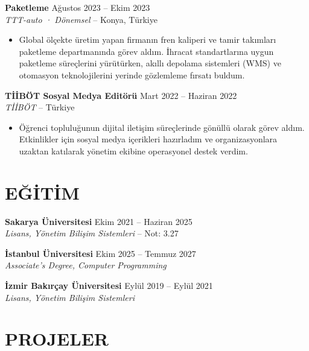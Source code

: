 \documentclass[a4paper,8pt]{article}
\begin{document}
\textbf{Paketleme} \hfill {\small Ağustos 2023 -- Ekim 2023}\\
{\small \textit{TTT-auto · Dönemsel} -- Konya, Türkiye}
\begin{itemize}
\item {\small Global ölçekte üretim yapan firmanın fren kaliperi ve tamir takımları paketleme departmanında görev aldım. İhracat standartlarına uygun paketleme süreçlerini yürütürken, akıllı depolama sistemleri (WMS) ve otomasyon teknolojilerini yerinde gözlemleme fırsatı buldum.}
\end{itemize}

\vspace{0pt}

\textbf{TİİBÖT Sosyal Medya Editörü} \hfill {\small Mart 2022 -- Haziran 2022}\\
{\small \textit{TİİBÖT} -- Türkiye}
\begin{itemize}
\item {\small Öğrenci topluluğunun dijital iletişim süreçlerinde gönüllü olarak görev aldım. Etkinlikler için sosyal medya içerikleri hazırladım ve organizasyonlara uzaktan katılarak yönetim ekibine operasyonel destek verdim.}
\end{itemize}

\section{EĞİTİM}

\textbf{Sakarya Üniversitesi} \hfill {\small Ekim 2021 -- Haziran 2025}\\
{\small \textit{Lisans, Yönetim Bilişim Sistemleri} -- Not: 3.27}

\vspace{0pt}

\textbf{İstanbul Üniversitesi} \hfill {\small Ekim 2025 -- Temmuz 2027}\\
{\small \textit{Associate's Degree, Computer Programming}}

\vspace{0pt}

\textbf{İzmir Bakırçay Üniversitesi} \hfill {\small Eylül 2019 -- Eylül 2021}\\
{\small \textit{Lisans, Yönetim Bilişim Sistemleri}}

\section{PROJELER}
\end{document}
